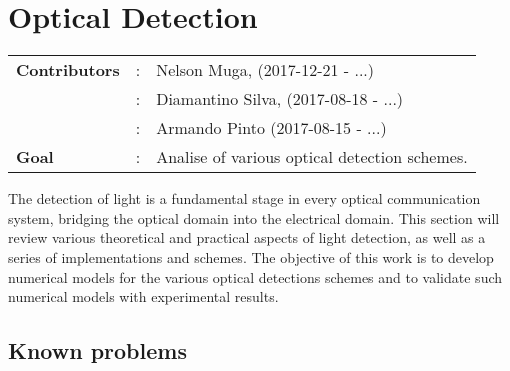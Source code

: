 

\clearpage
\section{Optical Detection}

\begin{tcolorbox}	
\begin{tabular}{p{2.75cm} p{0.2cm} p{10.5cm}}
\textbf{Contributors}  &:& Nelson Muga, (2017-12-21 - ...)\\
                       &:& Diamantino Silva, (2017-08-18 - ...)\\
                       &:& Armando Pinto (2017-08-15 - ...)\\
\textbf{Goal}          &:& Analise of various optical detection schemes.\\
\end{tabular}
\end{tcolorbox}
%
\vspace{2em}
%
The detection of light is a fundamental stage in every optical communication system, bridging the optical domain into the electrical domain. This section will review various theoretical and practical aspects of light detection, as well as a series of implementations and schemes.
The objective of this work is to develop numerical models for the various optical detections schemes and to validate such numerical models with experimental results.\\
%
%





%
%
\subsection{Known problems}
%
%
%
